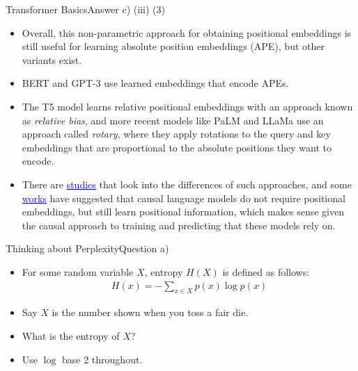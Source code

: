 \documentclass[t]{beamer}
\begin{document}
\begin{frame}{Transformer Basics}{Answer c) (iii) (3)}
    \begin{itemize}
        \item Overall, this non-parametric approach for obtaining
              positional embeddings is still useful for learning absolute
              position embeddings (APE), but other variants exist.
        \item BERT and GPT-3 use learned embeddings that encode APEs.
        \item The T5 model learns relative positional embeddings with an
              approach known as \emph{relative bias}, and more recent
              models like PaLM and LLaMa use an approach called
              \emph{rotary}, where they apply rotations to the query and
              key embeddings that are proportional to the absolute
              positions they want to encode.
        \item There are
              \href{https://arxiv.org/pdf/2305.19466.pdf}{\textcolor{blue}{\underline{studies}}}
              that look into the differences of such approaches, and some
              \href{https://aclanthology.org/2022.findings-emnlp.99.pdf}{\textcolor{blue}{\underline{works}}}
              have suggested that causal language models do not require
              positional embeddings, but still learn positional
              information, which makes sense given the causal approach
              to training and predicting that these models rely on.
    \end{itemize}
\end{frame}

\begin{frame}{Thinking about Perplexity}{Question a)}
    \begin{itemize}
        \item For some random variable $X$, entropy $H(X)$ is defined as
              follows:
              \begin{align}
                  H(x) = -\sum_{x\in X} p(x)\log p(x)
              \end{align}
        \item Say $X$ is the number shown when you toss a fair die.
        \item What is the entropy of $X$?
        \item Use $\log$ base 2 throughout.
    \end{itemize}
\end{frame}
\end{document}
